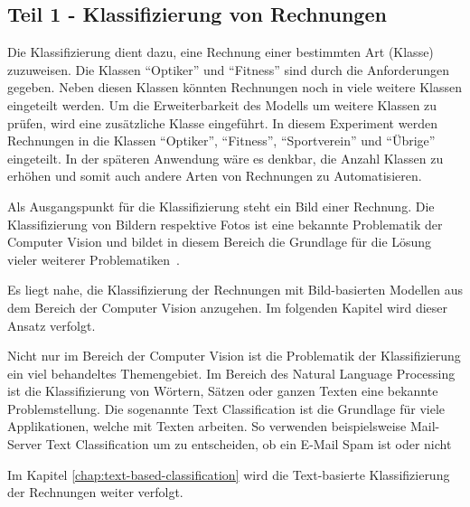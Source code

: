 \subsection{Teil 1 - Klassifizierung von Rechnungen}

Die Klassifizierung dient dazu, eine Rechnung einer bestimmten Art (Klasse) zuzuweisen. Die Klassen \enquote{Optiker} und \enquote{Fitness} sind durch die Anforderungen gegeben. Neben diesen Klassen könnten Rechnungen noch in viele weitere Klassen eingeteilt werden. Um die Erweiterbarkeit des Modells um weitere Klassen zu prüfen, wird eine zusätzliche Klasse eingeführt. In diesem Experiment werden Rechnungen in die Klassen \enquote{Optiker}, \enquote{Fitness}, \enquote{Sportverein} und \enquote{Übrige} eingeteilt. In der späteren Anwendung wäre es denkbar, die Anzahl Klassen zu erhöhen und somit auch andere Arten von Rechnungen zu Automatisieren.

Als Ausgangspunkt für die Klassifizierung steht ein Bild einer Rechnung. Die Klassifizierung von Bildern respektive Fotos ist eine bekannte Problematik der Computer Vision und bildet in diesem Bereich die Grundlage für die Lösung vieler weiterer Problematiken~\autocite{StanfordGithubClassification}. 


Es liegt nahe, die Klassifizierung der Rechnungen mit Bild-basierten Modellen aus dem Bereich der Computer Vision anzugehen. Im folgenden Kapitel wird dieser Ansatz verfolgt.

Nicht nur im Bereich der Computer Vision ist die Problematik der Klassifizierung ein viel behandeltes Themengebiet. Im Bereich des Natural Language Processing ist die Klassifizierung von Wörtern, Sätzen oder ganzen Texten eine bekannte Problemstellung. Die sogenannte Text Classification ist die Grundlage für viele Applikationen, welche mit Texten arbeiten. So verwenden beispielsweise Mail-Server Text Classification um zu entscheiden, ob ein E-Mail Spam ist oder nicht~\autocite{GoogleTextClassification}

Im Kapitel \ref{chap:text-based-classification} wird die Text-basierte Klassifizierung der Rechnungen weiter verfolgt.

